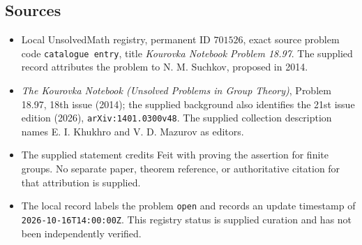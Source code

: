 \documentclass[11pt]{article}
\begin{document}
\subsection{Sources}
\begin{itemize}
\item Local UnsolvedMath registry, permanent ID \(701526\), exact source problem code \texttt{catalogue entry}, title \emph{Kourovka Notebook Problem 18.97}. The supplied record attributes the problem to N. M. Suchkov, proposed in 2014.
\item \emph{The Kourovka Notebook (Unsolved Problems in Group Theory)}, Problem 18.97, 18th issue (2014); the supplied background also identifies the 21st issue edition (2026), \texttt{arXiv:1401.0300v48}. The supplied collection description names E. I. Khukhro and V. D. Mazurov as editors.
\item The supplied statement credits Feit with proving the assertion for finite groups. No separate paper, theorem reference, or authoritative citation for that attribution is supplied.
\item The local record labels the problem \texttt{open} and records an update timestamp of \texttt{2026-10-16T14:00:00Z}. This registry status is supplied curation and has not been independently verified.
\end{itemize}
\end{document}
